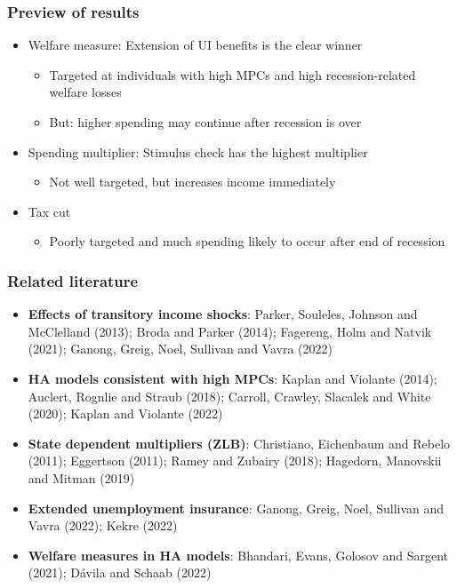 \documentclass[pdflatex,aspectratio=169]{beamer}
\begin{document}
\begin{frame}
\frametitle{Preview of results}
\begin{itemize}
\itemsep = \bigskipamount 
\item Welfare measure: Extension of UI benefits is the clear winner 
\begin{itemize}
\itemsep = .25\bigskipamount 
\item Targeted at individuals with high MPCs and high recession-related welfare losses
\item But: higher spending may continue after recession is over 
\end{itemize}
\item Spending multiplier: Stimulus check has the highest multiplier 
\begin{itemize}
\itemsep = .25\bigskipamount 
\item Not well targeted, but increases income immediately 
\end{itemize}
\item Tax cut
\begin{itemize}
	\itemsep = .25\bigskipamount 
	\item Poorly targeted and much spending likely to occur after end of recession
\end{itemize}
\end{itemize}
\end{frame}

\begin{frame}
\frametitle{Related literature}
\small
\begin{itemize}
\item \textbf{Effects of transitory income shocks}: 
Parker, Souleles, Johnson and McClelland (2013); Broda and Parker (2014); Fagereng, Holm and Natvik (2021); Ganong, Greig, Noel, Sullivan and Vavra (2022)
\item \textbf{HA models consistent with high MPCs}: 
Kaplan and Violante (2014); Auclert, Rognlie and Straub (2018); Carroll, Crawley, Slacalek and White (2020); Kaplan and Violante (2022) 
\item \textbf{State dependent multipliers (ZLB)}: 
Christiano, Eichenbaum and Rebelo (2011); Eggertson (2011); Ramey and Zubairy (2018); Hagedorn, Manovskii and Mitman (2019) 
\item \textbf{Extended unemployment insurance}:
Ganong, Greig, Noel, Sullivan and Vavra (2022); Kekre (2022) 
\item \textbf{Welfare measures in HA models}:
Bhandari, Evans, Golosov and Sargent (2021); D{\'a}vila and Schaab (2022)
\end{itemize}
\normalsize
\end{frame}
\end{document}
